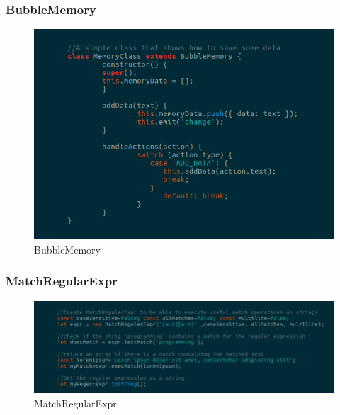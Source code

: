 \subsubsection{BubbleMemory}
\begin{figure}[H]
	\centering
	\includegraphics[width=14cm]{../../documenti/UserManualFramework/framework_model/4framework_model_memory.png}
	\caption{BubbleMemory}
\end{figure}

\subsubsection{MatchRegularExpr}
\begin{figure}[H]
	\centering
	\includegraphics[width=14cm]{../../documenti/UserManualFramework/framework_model/5framework_model_regexp1.png}
	\caption{MatchRegularExpr}
\end{figure}

